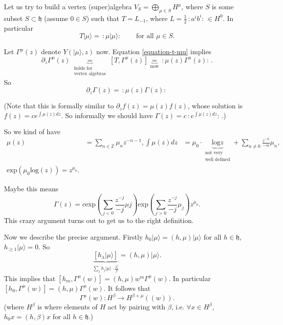 \medskip\noindent
Let us try to build a vertex (super)algebra
$V_S=\bigoplus_{\mu \in S}H^\mu$, where $S$
is some
subset $S \subset \mathfrak{h}$ (assume $0
\in S$)
such that $T=L_{-1}$, where
$L=\frac{1}{2}\,:\!a^ib^i\!:\, \in H^0$.
In particular
\begin{equation}
\label{equation-t-mu}
T|\mu\rangle=\,:\!\mu|\mu\rangle\!:\,\qquad
\text{for all }\mu \in S.
\end{equation}

\noindent
Let $\Gamma^\mu(z)$ denote $Y(|\mu\rangle,z)$
now.
Equation \ref{equation-t-mu} implies
$$
\partial_z\Gamma^\mu(z)\underbrace{=}
_{\substack{\text{holds
for}
 \\\text{vertex
algebras} }}[T,\Gamma^\mu(z)]
\underbrace{=}_{\text{now}}
\,:\!\mu(z)\Gamma^\mu(z)\!:\,.
$$
So
\begin{equation}
\label{equation-t-mu2}
\partial_z\Gamma(z)=\,:\!\mu(z)\Gamma(z)\!:\,
\end{equation}

\noindent
(Note that this is formally similar to
$\partial_zf(z)=\mu(z)f(z)$, whose solution
is
$f(z)=ce^{\int \mu(z)dz}$. So informally we
should have $\Gamma(z)=c\,:\!e^{\int
\mu(z)dz}\!:\,$.)

So we kind of have
$$
\begin{aligned}
\mu(z)&=\sum_{n \in \mathbb{Z}}\mu_nz^{-n-1},
\int\mu(z)dz&=\mu_0\cdot
\underbrace{\text{log}z}_{\substack{\text{not
very} \\
\text{well defined} }}+\sum_{n \neq
0}\frac{z^{-n}}{-n}\mu_n,\\
\text{exp}(\mu_0\text{log}(z))=z^{\mu_0}.
\end{aligned}
$$

Maybe this means
\begin{equation}
\label{equation-maybe-this-means}
\Gamma(z)=c
\text{exp}\left(\sum_{j<0}\frac{z^{-j}}{-j}
\mu
j\right)
\text{exp}\left(\sum_{j>0}\frac{z^{-j}}{-j}
\mu_j\right)z^{\mu_0}.
\end{equation}
This crazy argument turns out to get us to
the right definition.

\medskip\noindent
Now we describe the precise argument.
Firstly $h_0|\mu\rangle=(h,\mu)|\mu\rangle$
for all $h \in \mathfrak{h}$,
$h_{\geq 1}|\mu\rangle=0$.
So
 $$
\underbrace{[h_\lambda |\mu\rangle]}
_{\sum_jh_j|\mu\rangle\cdot\frac{\lambda^j}
{j!}}=(h,\mu)|\mu\rangle.
$$
This implies that
$[h_m,\Gamma^\mu(w)]=(h,\mu)w^m\Gamma^\mu(w)
$.
In particular
$[h_0,\Gamma^\mu(w)]=(h,\mu)\Gamma^\mu(w)$.
It follows that
$$
\Gamma^\mu(w):H^\beta \to H^{\beta+\mu}((w)).
$$
(where $H^\beta$ is where elements of $H$ act
by pairing with $\beta$, i.e.
$\forall x \in H^\beta$, $h_0x=(h,\beta)x$
for all $h \in \mathfrak{h}$.)

